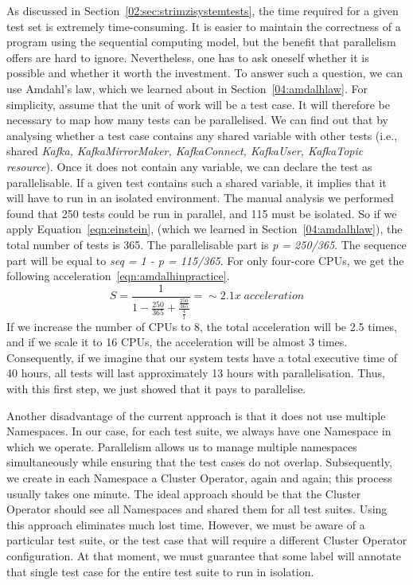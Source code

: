 As discussed in Section~\ref{02:sec:strimzisystemtests}, the time required for a given test set is extremely time-consuming.
It is easier to maintain the correctness of a program using the sequential computing model, but the benefit that parallelism offers are hard to ignore.
Nevertheless, one has to ask oneself whether it is possible and whether it worth the investment.
To answer such a question, we can use Amdahl's law, which we learned about in Section~\ref{04:amdalhlaw}.
For simplicity, assume that the unit of work will be a test case.
It will therefore be necessary to map how many tests can be parallelised.
We can find out that by analysing whether a test case contains any shared variable with other tests (i.e., shared \emph{Kafka, KafkaMirrorMaker, KafkaConnect, KafkaUser, KafkaTopic resource}).
Once it does not contain any variable, we can declare the test as parallelisable.
If a given test contains such a shared variable, it implies that it will have to run in an isolated environment.
The manual analysis we performed found that 250 tests could be run in parallel, and 115 must be isolated.
So if we apply Equation~\eqref{eqn:einstein}, (which we learned in Section~\ref{04:amdalhlaw}), the total number of tests is 365.
The parallelisable part is \emph{p = 250/365}.
The sequence part will be equal to \emph{seq = 1 - p = 115/365}.
For only four-core CPUs, we get the following acceleration~\eqref{eqn:amdalhinpractice}.
\begin{equation}
    \label{eqn:amdalhinpractice}
    S = \frac{1}{1 - \frac{250}{365} + \frac{\frac{250}{365}}{\frac{4}{1}}} =\sim 2.1x \; acceleration
    \tag{3}
\end{equation}
If we increase the number of CPUs to 8, the total acceleration will be 2.5 times, and if we scale it to 16 CPUs, the acceleration will be almost 3 times.
Consequently, if we imagine that our system tests have a total executive time of 40 hours, all tests will last approximately 13 hours with parallelisation.
Thus, with this first step, we just showed that it pays to parallelise.

Another disadvantage of the current approach is that it does not use multiple Namespaces.
In our case, for each test suite, we always have one Namespace in which we operate.
Parallelism allows us to manage multiple namespaces simultaneously while ensuring that the test cases do not overlap.
Subsequently, we create in each Namespace a Cluster Operator, again and again;
this process usually takes one minute.
The ideal approach should be that the Cluster Operator should see all Namespaces and shared them for all test suites.
Using this approach eliminates much lost time.
However, we must be aware of a particular test suite, or the test case that will require a different Cluster Operator configuration.
At that moment, we must guarantee that some label will annotate that single test case for the entire test suite to run in isolation.

